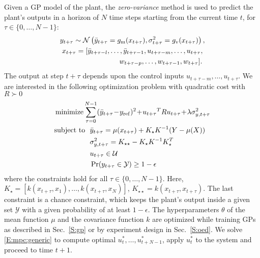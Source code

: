Given a GP model of the plant, the \emph{zero-variance} method is used to predict the plant's outputs in a horizon of $N$ time steps starting from the current time $t$, for \(\tau \in \{0,\dots,N-1\}\):
\begin{gather}
  \label{eq:dpc:prediction}
y_{t+\tau} \sim \GaussianDist{\bar{y}_{t+\tau} = g_{\mathrm m}(x_{t+\tau})}{\sigma^2_{t+\tau} = g_{\mathrm v}(x_{t+\tau})}, \\
x_{t + \tau} = [\bar y_{t+ \tau-l}, \dots, \bar y_{t+ \tau-1}, u_{t+ \tau-m}, \dots, u_{t+ \tau}, \nonumber \\
\qquad\qquad\qquad\qquad  w_{t+ \tau-p}, \dots, w_{t+ \tau-1}, w_{t+ \tau}]\text. \nonumber
\end{gather}
The output at step \(t+\tau\) depends upon %
the control inputs \(u_{t+\tau-m}, \dots, u_{t+\tau}\).
We are interested in the following optimization problem with quadratic cost with \(R \succ 0\)
\begin{align}
  &\minimize \sum_{\tau=0}^{N-1} (\bar{y}_{t+\tau}\!-\!y_{\mathrm{ref}})^2 \!+\! {u_{t+\tau}}^T R {u_{t+\tau}} \!+\! \lambda \sigma^2_{y,t+\tau} \label{E:mpc:generic} \\
  & 
    \begin{aligned}
      \st\ \  & \bar{y}_{t+\tau} = \mu(x_{t+\tau}) + K_\star K^{-1} (Y - \mu(X)) \nonumber\\
      & \sigma^2_{y,t+\tau} = K_{\star \star} - K_\star K^{-1} K_\star^T \\
      & u_{t+\tau} \in \mathcal{U} \nonumber \\
      & \Pr(y_{t+\tau} \in \mathcal{Y}) \geq 1 - \epsilon \nonumber
    \end{aligned}
\end{align}
where the constraints hold for all \(\tau \in \{0,\dots,N-1\}\).
Here, \(K_\star = [k(x_{t+\tau}, x_1), \dots, k(x_{t+\tau}, x_N)]\), \(K_{\star \star} = k(x_{t+\tau}, x_{t+\tau})\). %
The last constraint is a chance constraint, which keeps the plant's output inside a given set $\mathcal{Y}$ with a given probability of at least $1 - \epsilon$.
The hyperparameters \(\theta\) of the mean function \(\mu\) and the covariance function \(k\) are optimized while training GPs as described in Sec.~\ref{S:gp} or by experiment design in Sec.~\ref{S:oed}.
We solve \eqref{E:mpc:generic} to compute optimal \(u_{t}^*, \dots, u_{t+N-1}^*\), apply \(u_{t}^*\) to the system and proceed to time \(t+1\).

